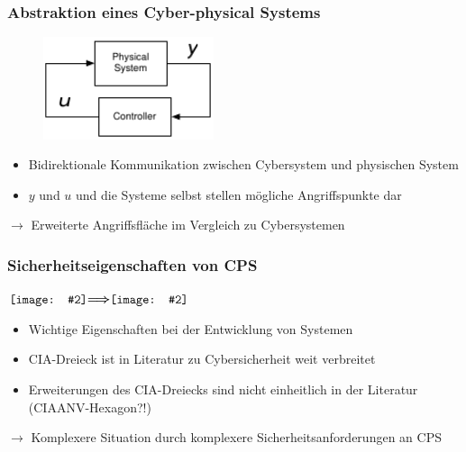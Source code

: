 \documentclass{sikslides}
\newcommand*{\vcenterimage}[2]{\vcenter{\hbox{\texttt{[image: \#2]}}}}
\newcommand*{\vcenterarrow}{\vcenter{\hbox{$\bm{\Longrightarrow}$}}}
\begin{document}
    \begin{frame}[label=abstrakt]
        \frametitle{Abstraktion eines Cyber-physical Systems}
        \begin{figure}
            \centering
            \includegraphics[width=5cm]{../figure/abstrakt}
        \end{figure}

        \begin{itemize}
            \item Bidirektionale Kommunikation zwischen Cybersystem und physischen System
            \item $y$ und $u$ und die Systeme selbst stellen mögliche Angriffspunkte dar
        \end{itemize}

        \pause

        \vspace{10px}
        $\rightarrow$ Erweiterte Angriffsfläche im Vergleich zu Cybersystemen
    \end{frame}

    \begin{frame}
        \frametitle{Sicherheitseigenschaften von CPS}
        \centering
        $\vcenterimage{2.5cm}{../figure/cia}\vcenterarrow\vcenterimage{3.5cm}{../figure/triad}$
        \vspace{10px}
        \begin{itemize}[<+->]
            \item Wichtige Eigenschaften bei der Entwicklung von Systemen
            \item CIA-Dreieck ist in Literatur zu Cybersicherheit weit verbreitet
            \item Erweiterungen des CIA-Dreiecks sind nicht einheitlich in der Literatur (CIAANV-Hexagon?!)
            \pause
        \end{itemize}
        \vspace{10px}

        $\rightarrow$ Komplexere Situation durch komplexere Sicherheitsanforderungen an CPS
    \end{frame}
\end{document}
